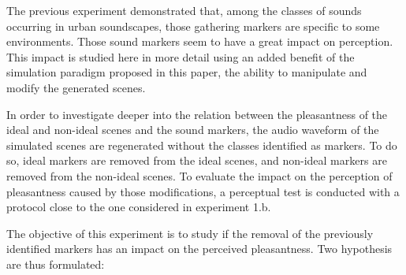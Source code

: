 \documentclass[12pt]{elsarticle}
\begin{document}

The previous experiment demonstrated that, among the classes of sounds occurring in urban soundscapes, those gathering markers are specific to some environments. Those sound markers seem to have a great impact on perception. This impact is studied here in more detail using an added benefit of the simulation paradigm proposed in this paper, the ability to manipulate and modify the generated scenes.


In order to investigate deeper into the relation between the pleasantness of the ideal and non-ideal scenes and the sound markers, the audio waveform of the simulated scenes are regenerated without the classes identified as markers. To do so, ideal markers are removed from the ideal scenes, and non-ideal markers are removed from the non-ideal scenes. To evaluate the impact on the perception of pleasantness caused by those modifications, a perceptual test is conducted with a protocol close to the one considered in experiment 1.b.



The objective of this experiment is to study if the removal of the previously identified markers has an impact on the perceived pleasantness. Two hypothesis are thus formulated:

\end{document}
